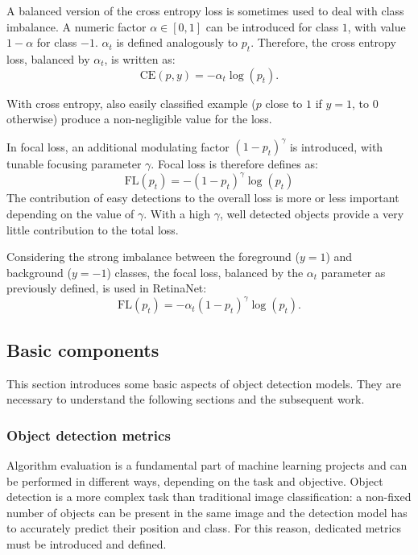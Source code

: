 \documentclass[%
    corpo=12pt,
    twoside,
    stile=classica,   
    tipotesi=magistrale,
    evenboxes,
    english,
	numerazioneromana,
]{toptesi}
\begin{document}
\bigskip
A balanced version of the cross entropy loss is sometimes used to deal with class imbalance. A numeric factor $\alpha\in\left[0,1\right]$ can be introduced for class $1$, with value $1-\alpha$ for class $-1$. $\alpha_t$ is defined analogously to $p_t$. Therefore, the cross entropy loss, balanced by $\alpha_t$, is written as:
\begin{equation}
	\text{CE}(p,y) = -\alpha_t\log(p_t).
\end{equation}

\bigskip
With cross entropy, also easily classified example ($p$ close to $1$ if $y=1$, to $0$ otherwise) produce a non-negligible value for the loss.

In focal loss, an additional modulating factor $\left(1-p_t\right)^\gamma$ is introduced, with tunable focusing parameter $\gamma$. Focal loss is therefore defines as:
\begin{equation}
	\text{FL}(p_t) = -\left(1-p_t\right)^\gamma \log(p_t)
\end{equation}
The contribution of easy detections to the overall loss is more or less important depending on the value of $\gamma$. With a high $\gamma$, well detected objects provide a very little contribution to the total loss.

Considering the strong imbalance between the foreground ($y=1$) and background ($y=-1$) classes, the focal loss, balanced by the $\alpha_t$ parameter as previously defined, is used in RetinaNet:
\begin{equation}
	\text{FL}(p_t) = -\alpha_t\left(1-p_t\right)^\gamma \log(p_t).
	\label{eq:focalloss}
\end{equation}

\subsection{Basic components}

This section introduces some basic aspects of object detection models. They are necessary to understand the following sections and the subsequent work.

\subsubsection{Object detection metrics}
Algorithm evaluation is a fundamental part of machine learning projects and can be performed in different ways, depending on the task and objective. Object detection is a more complex task than traditional image classification: a non-fixed number of objects can be present in the same image and the detection model has to accurately predict their position and class. For this reason, dedicated metrics must be introduced and defined.
\end{document}
